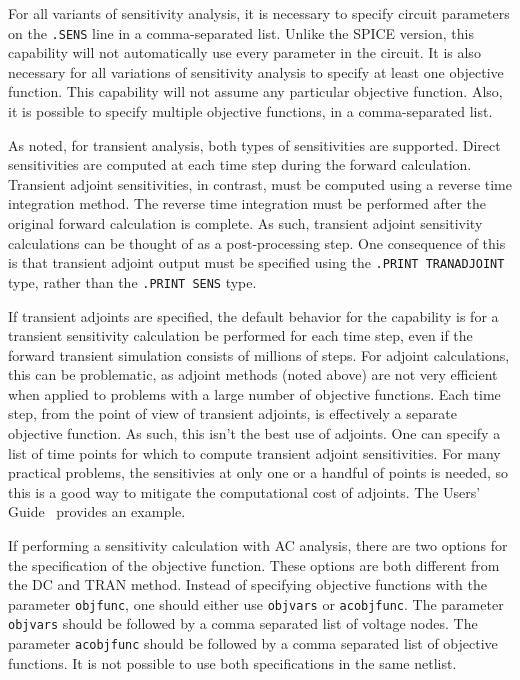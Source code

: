 \begin{Command}
For all variants of sensitivity analysis, it is necessary to specify 
circuit parameters on the \texttt{.SENS} line in a comma-separated list.  Unlike the SPICE version, 
this capability will not automatically use every parameter in the circuit.
It is also necessary for all variations of sensitivity analysis to specify at least 
one objective function.  This capability will not assume any particular 
objective function.  Also, it is possible to specify multiple
objective functions, in a comma-separated list.

As noted, for transient analysis, both types of sensitivities are supported.
Direct sensitivities are computed at each time step during the forward 
calculation.  Transient adjoint sensitivities, in contrast, must be computed
using a reverse time integration method.  The reverse time integration must be 
performed after the original forward calculation is complete.  As such, transient 
adjoint sensitivity calculations can be thought of as a post-processing step.  
One consequence of this is that transient adjoint output must be specified using 
the \texttt{.PRINT TRANADJOINT} type, rather than the \texttt{.PRINT SENS} 
type.

If transient adjoints are specified, the default behavior for the capability is 
for a transient sensitivity calculation be performed for each time step, even 
if the forward transient simulation consists of millions of steps.  For adjoint 
calculations, this can be problematic, as adjoint methods (noted above) are not 
very efficient when applied to problems with a large number of objective functions.
Each time step, from the point of view of transient adjoints, is effectively a 
separate objective function.  As such, this isn't the best use of adjoints.  
One can specify  a list of time points for which to compute transient adjoint
sensitivities. For many practical problems, the sensitivies at only one or a 
handful of points is needed, so this is a good way to mitigate the computational 
cost of adjoints.  The \Xyce{} Users' Guide~\UsersGuide{} provides an example.

If performing a sensitivity calculation with AC analysis, 
there are two options for the specification of the 
objective function. These options are both different from the DC and TRAN method.
Instead of specifying objective functions with the parameter \texttt{objfunc},
one should either use \texttt{objvars} or \texttt{acobjfunc}.  
The parameter \texttt{objvars} should be followed by a comma separated list of voltage nodes.
The parameter \texttt{acobjfunc} should be followed by a comma separated list of objective functions.
It is not possible to use both specifications in the same netlist.

\end{Command}
